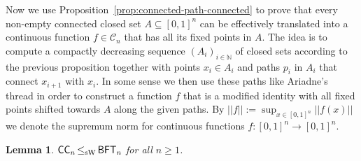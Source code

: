 \documentclass[a4paper]{amsart}
\def\CC{{\mathcal C}}
\def\IN{{\mathbb{N}}}
\def\In{\subseteq}
\def\BFT{\mbox{\rm\sffamily BFT}}
\def\ConC{\mbox{\rm\sffamily CC}}
\def\leqSW{\mathop{\leq_{\mathrm{sW}}}}
\newtheorem{lemma}[theorem]{Lemma}
\theoremstyle{definition}
\begin{document}
Now we use Proposition~\ref{prop:connected-path-connected} to prove that every non-empty connected closed set $A\In[0,1]^n$ can be 
effectively translated into a continuous function $f\in\CC_n$ that has all its fixed points in $A$.
The idea is to compute a compactly decreasing sequence $(A_i)_{i\in\IN}$ of closed sets according to the previous
proposition together with points $x_i\in A_i$ and paths $p_i$ in $A_i$ that connect $x_{i+1}$ with $x_i$.
In some sense we then use these paths like Ariadne's thread in order to construct a function $f$ that is a modified identity
with all fixed points shifted towards $A$ along the given paths.
By $||f||:=\sup_{x\in[0,1]^n}||f(x)||$ we denote the supremum norm for continuous functions $f:[0,1]^n\to[0,1]^n$.

\begin{lemma}
\label{lem:CC-BFT}
$\ConC_n\leqSW\BFT_n$ for all $n\geq1$.
\end{lemma}
\end{document}
